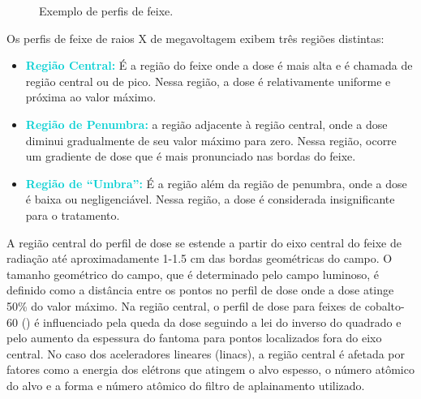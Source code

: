\documentclass[11pt,a4paper]{article}
\begin{document}
    \begin{figure}[h]
        \centering
        \caption{Exemplo de perfis de feixe.}
        \label{fig:perfiDeFeixe}
    \end{figure}

    Os perfis de feixe de raios X de megavoltagem exibem três regiões distintas:
    \begin{itemize}
        \item \textcolor{DarkTurquoise}{\textbf{Região Central:}}  É a região do feixe onde a dose é mais alta e é chamada de região central ou de pico. Nessa região, a dose é relativamente uniforme e próxima ao valor máximo.
        \item \textcolor{DarkTurquoise}{\textbf{Região de Penumbra:}}  a região adjacente à região central, onde a dose diminui gradualmente de seu valor máximo para zero. Nessa região, ocorre um gradiente de dose que é mais pronunciado nas bordas do feixe.
        \item \textcolor{DarkTurquoise}{\textbf{Região de ``Umbra'':}}  É a região além da região de penumbra, onde a dose é baixa ou negligenciável. Nessa região, a dose é considerada insignificante para o tratamento.
    \end{itemize}

    A região central do perfil de dose se estende a partir do eixo central do feixe de radiação até aproximadamente 1-1.5 cm das bordas geométricas do campo. O tamanho geométrico do campo, que é determinado pelo campo luminoso, é definido como a distância entre os pontos no perfil de dose onde a dose atinge 50\% do valor máximo. Na região central, o perfil de dose para feixes de cobalto-60 () é influenciado pela queda da dose seguindo a lei do inverso do quadrado e pelo aumento da espessura do fantoma para pontos localizados fora do eixo central. No caso dos aceleradores lineares (linacs), a região central é afetada por fatores como a energia dos elétrons que atingem o alvo espesso, o número atômico do alvo e a forma e número atômico do filtro de aplainamento utilizado.
\end{document}
